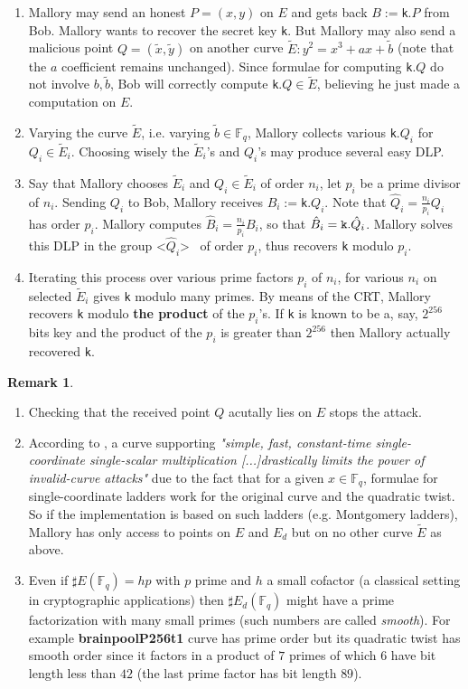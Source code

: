 \documentclass[10pt]{article}
\theoremstyle{definition}
\newtheorem{remark}{Remark}
\newcommand{\F}{\mathbb{F}}
\begin{document}
\begin{enumerate}
\item Mallory may send an honest $P = (x,y)$ on $E$ and gets back $B:=$\verb|k|$.P$ from Bob.
Mallory wants to recover the secret key \verb|k|.
But Mallory may also send a malicious point $Q = ( \tilde{x},\tilde{y})$ 
on another curve $\tilde{E} : y^2 = x^3+ax+\tilde{b}$ (note that the $a$ coefficient remains unchanged).
Since formulae for computing \verb|k|$.Q$ do not involve $b, \tilde{b}$, Bob will correctly compute \verb|k|$.Q \in \tilde{E}$, believing he just made a computation on $E$.
\item Varying the curve $\tilde{E}$,  i.e. varying $\tilde{b} \in \F_q$, Mallory collects various \verb|k|$.Q_i$ for $Q_i \in \tilde{E}_i$.
Choosing wisely the $\tilde{E}_i$'s and $Q_i$'s may produce several easy DLP.
\item Say that Mallory chooses $\tilde{E}_i$ and  $Q_i \in \tilde{E}_i$ of order $n_i$, let $p_i$ be a prime divisor of $n_i$.
Sending $Q_i$ to Bob, Mallory receives $B_i:=$\verb|k|$.Q_i$.
Note that $\hat{Q}_i=\frac{n_i}{p_i}Q_i$ has order $p_i$.
Mallory computes $\hat{B}_i=\frac{n_i}{p_i}B_i$, so that $\hat{B}_i =  \verb|k|.\hat{Q}_i$.
Mallory solves this DLP in the group \textless$\hat{Q}_i$\textgreater~ of order $p_i$, thus recovers \verb|k| modulo $p_i$. 
\item Iterating this process over various prime factors $p_i$ of $n_i$, for various $n_i$ on selected $\tilde{E}_i$ gives \verb|k| modulo many primes.
By means of the CRT, Mallory recovers \verb|k| modulo \textbf{the product} of the $p_i$'s.
If \verb|k| is known to be a, say, $2^{256}$ bits key and the product of the $p_i$ is greater than $2^{256}$ then Mallory actually recovered  \verb|k|.
\end{enumerate}

\begin{remark}
\begin{enumerate}
\item Checking that the received point $Q$ acutally lies on $E$ stops the attack.
\item According to \cite{cryptoeprint:2024/1265}, a curve supporting \textsl{"simple, fast, constant-time single-coordinate single-scalar multiplication [...]drastically limits the power of invalid-curve attacks"} due to the fact that for a given $x \in \F_q$, formulae for single-coordinate ladders work for the original curve and the quadratic twist.
So if the implementation is based on such ladders (e.g. Montgomery ladders), Mallory has only access to points on $E$ and $E_d$ but on no other curve $\tilde{E}$ as above.
\item Even if $\sharp{} E(\F_q) = hp$ with $p$ prime and $h$ a small cofactor (a classical setting in cryptographic applications) then $\sharp{}E_d(\F_q)$ might have a prime factorization with many small primes (such numbers are called \textsl{smooth}).
For example \textbf{brainpoolP256t1} curve has prime order but its quadratic twist has smooth order since it factors in a product of $7$ primes of which $6$ have bit length less than $42$ (the last prime factor has bit length $89$).
\end{enumerate}
\end{remark}
\end{document}
